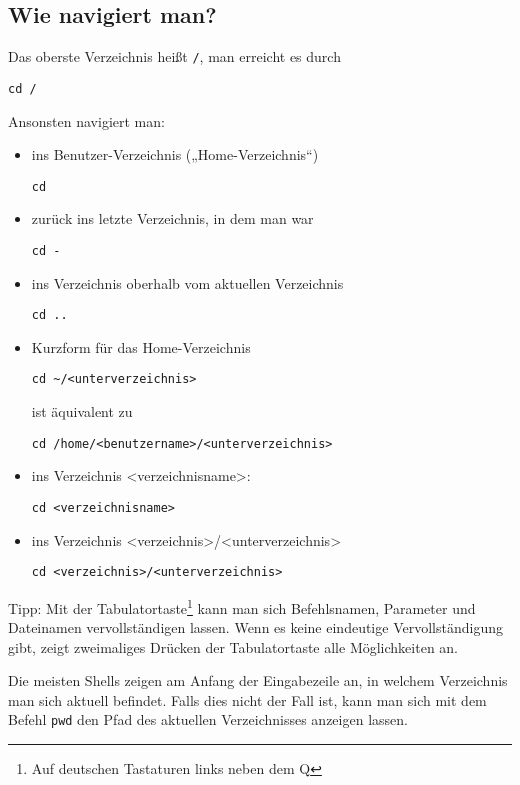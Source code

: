 \documentclass[a4paper,12pt]{article}
\begin{document}
\subsection{Wie navigiert man?}
Das oberste Verzeichnis heißt \texttt{/}, man erreicht es durch 
\begin{lstlisting}
cd /
\end{lstlisting}	
Ansonsten navigiert man:
\begin{itemize}
\item ins Benutzer-Verzeichnis („Home-Verzeichnis“)
\begin{lstlisting}
cd
\end{lstlisting}
\item zurück ins letzte Verzeichnis, in dem man war 
\begin{lstlisting}
cd -
\end{lstlisting}
\item ins Verzeichnis oberhalb vom aktuellen Verzeichnis 
\begin{lstlisting}
cd ..
\end{lstlisting}
\item Kurzform für das Home-Verzeichnis 
\begin{lstlisting}
cd ~/<unterverzeichnis>
\end{lstlisting} 
ist äquivalent zu 
\begin{lstlisting}
cd /home/<benutzername>/<unterverzeichnis>
\end{lstlisting}
\item ins Verzeichnis <verzeichnisname>: 
\begin{lstlisting}
cd <verzeichnisname>
\end{lstlisting}
\item ins Verzeichnis <verzeichnis>/<unterverzeichnis> 
\begin{lstlisting}
cd <verzeichnis>/<unterverzeichnis>
\end{lstlisting}
\end{itemize}

Tipp: Mit der Tabulatortaste\footnote{Auf deutschen Tastaturen links neben dem Q} kann man sich Befehlsnamen, Parameter und Dateinamen vervollständigen lassen. Wenn es keine eindeutige Vervollständigung gibt, zeigt zweimaliges Drücken der Tabulatortaste alle Möglichkeiten an.

Die meisten Shells zeigen am Anfang der Eingabezeile an, in welchem Verzeichnis man sich aktuell befindet.
Falls dies nicht der Fall ist, kann man sich mit dem Befehl \texttt{pwd} den Pfad des aktuellen Verzeichnisses anzeigen lassen.
\end{document}
